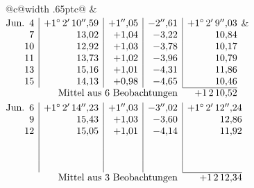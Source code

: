 \noindent\begin{tabular}{@{}c@{\hspace{.4em}\vrule width .65pt\hspace{.4em}}c@{}}
 &
 \\[.18ex]
\(\begin{array}[t]{@{}r|r|r|r|r@{}}
\text{Jun.}\enspace 4 & +1^\circ\,2'\,10''{,}59 & +1''{,}05 & -2''{,}61 & +1^\circ\,2'\,9''{,}03\\
7 & 13{,}02 & +1{,}04 & -3{,}22 & 10{,}84\\
10 & 12{,}92 & +1{,}03 & -3{,}78 & 10{,}17\\
11 & 13{,}73 & +1{,}02 & -3{,}96 & 10{,}79\\
13 & 15{,}16 & +1{,}01 & -4{,}31 & 11{,}86\\
15 & 14{,}13 & +0{,}98 & -4{,}65 & 10{,}46\\
\cline{5-5}
\multicolumn{4}{r}{\text{Mittel aus 6 Beobachtungen}} & +1\,2\,10{,}52
\end{array}\)
&
\(\begin{array}[t]{@{}r|r|r|r|r@{}}
\text{Jun.}\enspace 6 & +1^\circ\,2'\,14''{,}23 & +1''{,}03 & -3''{,}02 & +1^\circ\,2'\,12''{,}24\\
9 & 15{,}43 & +1{,}03 & -3{,}60 & 12{,}86\\
12 & 15{,}05 & +1{,}01 & -4{,}14 & 11{,}92\\
 & & & & \\
 & & & & \\
 & & & & \\
\cline{5-5}
\multicolumn{4}{r}{\text{Mittel aus 3 Beobachtungen}} & +1\,2\,12{,}34
\end{array}\)
\end{tabular}\par\medskip
{}
